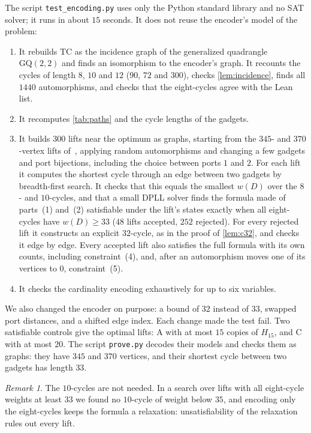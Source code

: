 \documentclass[11pt]{amsart}
\theoremstyle{remark}
\newtheorem{remark}[theorem]{Remark}
\newcommand{\code}[1]{\texttt{#1}}
\newcommand{\Hfifteen}{H_{15}}
\newcommand{\TC}{\mathrm{TC}}
\begin{document}
The script \code{test\_encoding.py} uses only the Python standard library and
no SAT solver; it runs in about $15$ seconds. It does not reuse the encoder's
model of the problem:
\begin{enumerate}[label=(\alph*)]
\item It rebuilds $\TC$ as the incidence graph of the generalized quadrangle
  $\mathrm{GQ}(2,2)$ and finds an isomorphism to the encoder's graph. It
  recounts the cycles of length $8$, $10$ and $12$ ($90$, $72$ and $300$),
  checks \cref{lem:incidence}, finds all $1440$ automorphisms, and checks that
  the eight-cycles agree with the Lean list.
\item It recomputes \cref{tab:paths} and the cycle lengths of the gadgets.
\item It builds $300$ lifts near the optimum as graphs, starting from the
  $345$- and $370$-vertex lifts of~\cite{Marszalek2026a}, applying random
  automorphisms and changing a few gadgets and port bijections, including the
  choice between ports $1$ and $2$. For each lift it computes the shortest
  cycle through an edge between two gadgets by breadth-first search. It checks
  that this equals the smallest $w(D)$ over the $8$- and $10$-cycles, and that
  a small DPLL solver finds the formula made of parts~(1) and~(2) satisfiable under the
  lift's states exactly when all eight-cycles have $w(D)\ge 33$ ($48$ lifts
  accepted, $252$ rejected). For every rejected lift it constructs an explicit
  $32$-cycle, as in the proof of \cref{lem:c32}, and checks it edge by edge.
  Every accepted lift also satisfies the full formula with its own counts,
  including constraint~(4), and, after an automorphism moves one of its
  vertices to $0$, constraint~(5).
\item It checks the cardinality encoding exhaustively for up to six variables.
\end{enumerate}
We also changed the encoder on purpose: a bound of $32$ instead of $33$,
swapped port distances, and a shifted edge index. Each change made the test
fail. Two satisfiable controls give the optimal lifts: \textsf{A} with at most
$15$ copies of $\Hfifteen$, and \textsf{C} with at most $20$. The script
\code{prove.py} decodes their models and checks them as graphs: they have
$345$ and $370$ vertices, and their shortest cycle between two gadgets has
length $33$.

\begin{remark}
The $10$-cycles are not needed. In a search over lifts with all eight-cycle
weights at least $33$ we found no $10$-cycle of weight below $35$, and
encoding only the eight-cycles keeps the formula a relaxation: unsatisfiability
of the relaxation rules out every lift.
\end{remark}
\end{document}
